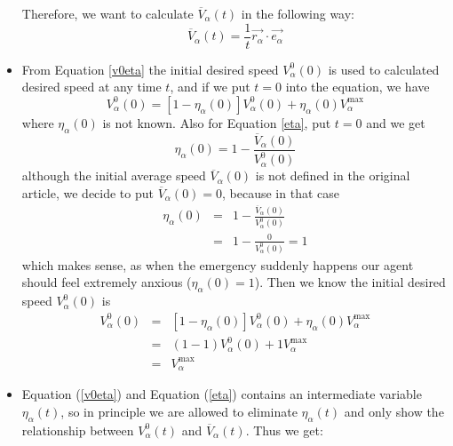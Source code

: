 \begin{itemize}
Therefore, we want to calculate $\overline{V}_{\alpha} \left( t \right)$ in the following way:
\begin{equation}\label{averagespeed}
   \overline{V}_{\alpha} \left( t \right) = \frac{1}{t} \vec{r_{\alpha}}\cdot \vec{e_{\alpha}} 
\end{equation}
\item From Equation \ref{v0eta} the initial desired speed $V_{\alpha}^{0} \left( 0 \right)$ is used to calculated desired speed at any time $ t $, and if we put $ t=0 $ into the equation, we have
\begin{equation}
    V_{\alpha}^{0}\left( 0 \right) = \left[ 1 - \eta_{\alpha} \left( 0 \right) \right] 
    V_{\alpha}^{0} \left( 0 \right) +
    \eta_{\alpha} \left( 0 \right)V_{\alpha}^{\text{max}}
\end{equation}
where $ \eta_{\alpha} \left( 0 \right) $ is not known.
Also for Equation \ref{eta}, put $ t=0 $ and we get
\begin{equation}
	\eta_{\alpha} \left( 0 \right) =
    1 - \frac{\overline{V}_{\alpha} \left( 0 \right)}
             {V_{\alpha}^{0} \left( 0 \right)}
\end{equation}
although the initial average speed $ \overline{V}_{\alpha} \left( 0 \right) $ is not defined in the original article, we decide to put $ \overline{V}_{\alpha} \left( 0 \right)=0 $, because in that case 
\begin{eqnarray}
	\eta_{\alpha} \left( 0 \right) &=&
    1 - \frac{\overline{V}_{\alpha} \left( 0 \right)}
             {V_{\alpha}^{0} \left( 0 \right)}\\
&=& 1 - \frac{0}{V_{\alpha}^{0} \left( 0 \right)}
= 1
\end{eqnarray}
which makes sense, as when the emergency suddenly happens our agent should feel extremely anxious ($ \eta_{\alpha} \left( 0 \right)=1 $). Then we know the initial desired speed $ V_{\alpha}^{0}\left( 0 \right) $ is
\begin{eqnarray}
    V_{\alpha}^{0}\left( 0 \right) &=& \left[ 1 - \eta_{\alpha} \left( 0 \right) \right] 
    V_{\alpha}^{0} \left( 0 \right) +
    \eta_{\alpha} \left( 0 \right)V_{\alpha}^{\text{max}}\\
&=& \left( 1 - 1 \right)  
    V_{\alpha}^{0} \left( 0 \right) +
    1 V_{\alpha}^{\text{max}}\\
&=& V_{\alpha}^{\text{max}}
\end{eqnarray}
\item Equation (\ref{v0eta}) and Equation (\ref{eta}) contains an intermediate variable $ \eta_{\alpha} \left( t \right) $, 
so in principle we are allowed to eliminate $ \eta_{\alpha} \left( t \right) $ and only show the 
relationship between $ V_{\alpha}^{0}(t) $ and $ \overline{V}_{\alpha} \left( t \right) $. Thus we get:


\end{itemize}
